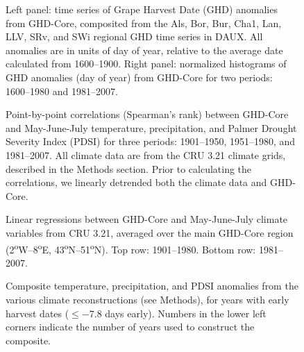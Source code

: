 \documentclass[final]{nature}
\begin{document}
\begin{figure}
\caption{Left panel: time series of Grape Harvest Date (GHD) anomalies from GHD-Core, composited from the Als, Bor, Bur, Cha1, Lan, LLV, SRv, and SWi regional GHD time series in DAUX. All anomalies are in units of day of year, relative to the average date calculated from 1600--1900. Right panel: normalized histograms of GHD anomalies (day of year) from GHD-Core for two periods: 1600--1980 and 1981--2007.}
\end{figure}

\begin{figure}
\caption{Point-by-point correlations (Spearman's rank) between GHD-Core and May-June-July temperature, precipitation, and Palmer Drought Severity Index (PDSI) for three periods: 1901--1950, 1951--1980, and 1981--2007. All climate data are from the CRU 3.21 climate grids, described in the Methods section. Prior to calculating the correlations, we linearly detrended both the climate data and GHD-Core.}
\end{figure}

\begin{figure}
\caption{Linear regressions between GHD-Core and May-June-July climate variables from CRU 3.21, averaged over the main GHD-Core region (2\textsuperscript{o}W--8\textsuperscript{o}E, 43\textsuperscript{o}N--51\textsuperscript{o}N). Top row: 1901--1980. Bottom row: 1981--2007.}
\end{figure}

\begin{figure}
\caption{Composite temperature, precipitation, and PDSI anomalies from the various climate reconstructions (see Methods), for years with early harvest dates ($\le-7.8$ days early). Numbers in the lower left corners indicate the number of years used to construct the composite.}
\end{figure}

\end{document}
